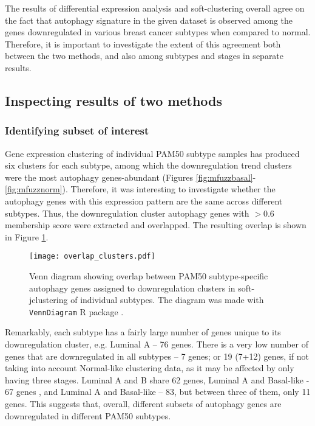 The results of differential expression analysis and soft-clustering overall agree on the fact that autophagy signature in the given dataset is observed among the genes downregulated in various breast cancer subtypes when compared to normal. Therefore, it is important to investigate the extent of this agreement both between the two methods, and also among subtypes and stages in separate results. 

\subsection{Inspecting results of two methods}

\subsubsection{Identifying subset of interest}

Gene expression clustering of individual PAM50 subtype samples has produced six clusters for each subtype, among which the downregulation trend clusters were the most autophagy genes-abundant (Figures \ref{fig:mfuzzbasal}-\ref{fig:mfuzznorm}). Therefore, it was interesting to investigate whether the autophagy genes with this expression pattern are the same across different subtypes. Thus, the downregulation cluster autophagy genes with $>0.6$ membership score were extracted and overlapped. The resulting overlap is shown in Figure \ref{fig:overlapclusters}. \\

            \begin{figure}[!h]
            \centering
            \texttt{[image: overlap\_clusters.pdf]} 
            \caption[Overlap between PAM50 subtype-specific downregulation cluster autophagy genes]{Venn diagram showing overlap between PAM50 subtype-specific autophagy genes assigned to downregulation clusters in soft-jclustering of individual subtypes. The diagram was made with \texttt{VennDiagram} R package \cite{venndiagram}. }
            \label{fig:overlapclusters}
            \end{figure}
            
Remarkably, each subtype has a fairly large number of  genes unique to its downregulation cluster, e.g. Luminal A -- 76 genes. There is a very low number of genes that are downregulated in all subtypes -- 7 genes; or 19 (7+12) genes, if not taking into account Normal-like clustering data, as it may be affected by only having three stages. Luminal A and B share 62 genes, Luminal A and Basal-like - 67 genes , and Luminal A and Basal-like -- 83, but between three of them, only 11 genes. This suggests that, overall, different subsets of autophagy genes are downregulated in different PAM50 subtypes. 



